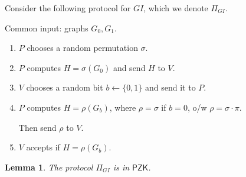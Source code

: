 \documentclass[11pt]{article}
\newcommand{\class}[1]{{\ensuremath{\mathsf{#1}}}}
\newcommand{\pzk}{\class{PZK}}
\newcommand{\zo}{\{0, 1\}}
\newtheorem{lemma}[theorem]{Lemma}
\begin{document}
Consider the following protocol for $GI$, which we denote $\Pi_{GI}$.

Common input: graphs $G_0, G_1$.
\begin{enumerate}
\item $P$ chooses a random permutation $\sigma$.
\item $P$ computes $H = \sigma(G_0)$ and send $H$ to $V$.
\item $V$ chooses a random bit $b \leftarrow \zo$ and send it to $P$.
\item $P$ computes $H = \rho(G_b)$, where $\rho = \sigma$ if $b=0$, o/w $\rho = \sigma \cdot \pi$.

Then send $\rho$ to $V$.
\item $V$ accepts if $H = \rho(G_b)$.
\end{enumerate}
\begin{lemma}
The  protocol $\Pi_{GI}$ is in 	$\pzk$.
\end{lemma}
\end{document}
